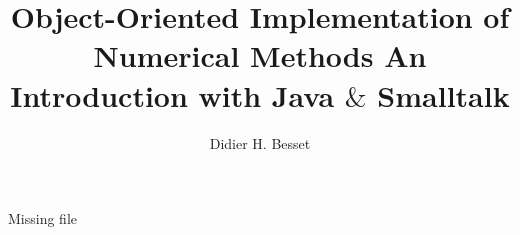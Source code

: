 \documentclass[twoside]{book}
\begin{document}
\title{Object-Oriented Implementation of \linebreak Numerical Methods\linebreak
 An Introduction with Java $\&$ Smalltalk}
\author{Didier H. Besset}
\maketitle {}

{\parskip 0pt \tableofcontents \listoffigures \listoftables
} \cleardoublepage{}












\appendix


 Missing file




\end{document}
